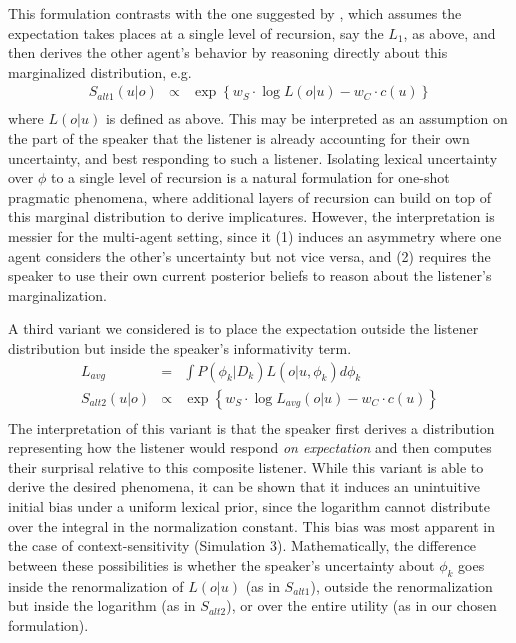 \documentclass[11pt, floatsintext]{apa6}
\begin{document}
This formulation contrasts with the one suggested by , which assumes the expectation takes places at a single level of recursion, say the $L_1$, as above, and then derives the other agent's behavior by reasoning directly about this marginalized distribution, e.g.
$$
\begin{array}{rcl}
S_{alt1}(u|o) & \propto & \exp\left\{w_S \cdot \log L(o|u) - w_C \cdot c(u)\right\} \\
\end{array}
$$
where $L(o|u)$ is defined as above.
This may be interpreted as an assumption on the part of the speaker that the listener is already accounting for their own uncertainty, and best responding to such a listener.
Isolating lexical uncertainty over $\phi$ to a single level of recursion is a natural formulation for one-shot pragmatic phenomena, where additional layers of recursion can build on top of this marginal distribution to derive implicatures.
However, the interpretation is messier for the multi-agent setting, since it (1) induces an asymmetry where one agent considers the other's uncertainty but not vice versa, and (2) requires the speaker to use their own current posterior beliefs to reason about the listener's marginalization.

A third variant we considered is to place the expectation outside the listener distribution but inside the speaker's informativity term.
$$
\begin{array}{rcl}
L_{avg} & = & \int P(\phi_k | D_k) L(o|u, \phi_k) d\phi_k \\
S_{alt2}(u|o) & \propto & \exp\left\{w_S \cdot \log L_{avg}(o|u) - w_C \cdot c(u)\right\} \\
\end{array}
$$
The interpretation of this variant is that the speaker first derives a distribution representing how the listener would respond \emph{on expectation} and then computes their surprisal relative to this composite listener.
While this variant is able to derive the desired phenomena, it can be shown that it induces an unintuitive initial bias under a uniform lexical prior, since the logarithm cannot distribute over the integral in the normalization constant. 
This bias was most apparent in the case of context-sensitivity (Simulation 3).
Mathematically, the difference between these possibilities is whether the speaker's uncertainty about $\phi_k$ goes inside the renormalization of $L(o|u)$ (as in $S_{alt1}$), outside the renormalization but inside the logarithm (as in $S_{alt2}$), or over the entire utility (as in our chosen formulation).
\end{document}
